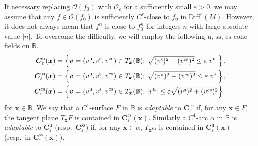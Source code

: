 \documentclass{amsart}
\theoremstyle{definition}
\numberwithin{equation}{section}
\numberwithin{figure}{section}
\begin{document}
If necessary replacing $\mathcal{O}(f_0)$ with $\mathcal{O}_{\varepsilon}$ for a sufficiently small $\varepsilon>0$, 
we may assume that any $f\in \mathcal{O}(f_0)$ is sufficiently $C^r$-close to $f_0$ in $\mathrm{Diff}^r(M)$.
However, it does not always mean that $f^n$ is close to $f_0^n$ for integers $n$ with large 
absolute value $|n|$.
To overcome the difficulty, we will employ the following $\mathrm{u}$, $\mathrm{ss}$, $\mathrm{cs}$-cone-fields on $\mathbb{B}$.
\begin{align*}
\boldsymbol{C}_{\varepsilon}^{\mathrm{u}}(\boldsymbol{x})&=
\left\{
\boldsymbol{v}=(v^{\mathrm{u}},v^{\mathrm{s}},v^{\mathrm{cs}})\in T_{\boldsymbol{x}}(\mathbb{B});\,
\sqrt{(v^{\mathrm{s}})^2+(v^{\mathrm{cs}})^2}\leq \varepsilon |v^{\mathrm{u}}|
\right\},\\
\boldsymbol{C}_{\varepsilon}^{\mathrm{ss}}(\boldsymbol{x})&=
\left\{
\boldsymbol{v}=(v^{\mathrm{u}},v^{\mathrm{s}},v^{\mathrm{cs}})\in T_{\boldsymbol{x}}(\mathbb{B});\,
\sqrt{(v^{\mathrm{u}})^2+(v^{\mathrm{cs}})^2}\leq\varepsilon |v^{\mathrm{s}}|
\right\},\\
\boldsymbol{C}_{\varepsilon}^{\mathrm{cs}}(\boldsymbol{x})&=
\left\{
\boldsymbol{v}=(v^{\mathrm{u}},v^{\mathrm{s}},v^{\mathrm{cs}})\in T_{\boldsymbol{x}}(\mathbb{B});\,
|v^{\mathrm{u}}|\leq\varepsilon\sqrt{(v^{\mathrm{s}})^2+(v^{\mathrm{cs}})^2}
\right\}
\index{Ceu@$\boldsymbol{C}_{\varepsilon}^{\mathrm{u}}(\boldsymbol{x})$, $\boldsymbol{C}_{\varepsilon}^{\mathrm{ss}}(\boldsymbol{x})$, $\boldsymbol{C}_{\varepsilon}^{\mathrm{cs}}(\boldsymbol{x})$}
\end{align*}
for $\boldsymbol{x}\in\mathbb{B}$.
We say that a $C^1$-surface $F$ in $\mathbb{B}$ is \emph{adaptable} to $\boldsymbol{C}_{\varepsilon}^{\mathrm{cs}}$ if, for any $\boldsymbol{x}\in F$, 
the tangent plane $T_{\boldsymbol{x}} F$ is contained in $\boldsymbol{C}_{\varepsilon}^{\mathrm{cs}}(\boldsymbol{x})$.
Similarly a $C^1$-arc $\alpha$ in $\mathbb{B}$ is \emph{adaptable} to $\boldsymbol{C}_{\varepsilon}^{\mathrm{u}}$ (resp.\ $\boldsymbol{C}_{\varepsilon}^{\mathrm{ss}}$) if, 
for any $\boldsymbol{x}\in \alpha$, $T_{\boldsymbol{x}}\alpha$ is contained in  $\boldsymbol{C}_{\varepsilon}^{\mathrm{u}}(\boldsymbol{x})$ (resp.\ in $\boldsymbol{C}_{\varepsilon}^{\mathrm{ss}}(\boldsymbol{x})$).
\end{document}
